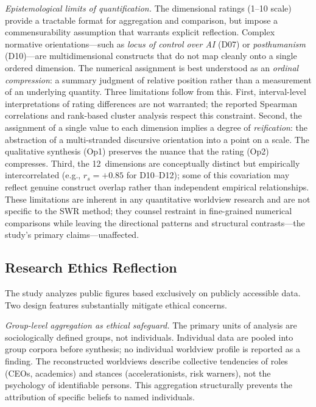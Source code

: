 \documentclass[12pt,a4paper]{article}
\begin{document}
\emph{Epistemological limits of quantification.} The dimensional ratings (1--10 scale) provide a tractable format for aggregation and comparison, but impose a commensurability assumption that warrants explicit reflection. Complex normative orientations---such as \emph{locus of control over AI} (D07) or \emph{posthumanism} (D10)---are multidimensional constructs that do not map cleanly onto a single ordered dimension. The numerical assignment is best understood as an \emph{ordinal compression}: a summary judgment of relative position rather than a measurement of an underlying quantity. Three limitations follow from this. First, interval-level interpretations of rating differences are not warranted; the reported Spearman correlations and rank-based cluster analysis respect this constraint. Second, the assignment of a single value to each dimension implies a degree of \emph{reification}: the abstraction of a multi-stranded discursive orientation into a point on a scale. The qualitative synthesis (Op1) preserves the nuance that the rating (Op2) compresses. Third, the 12~dimensions are conceptually distinct but empirically intercorrelated (e.g., $r_s = +0.85$ for D10--D12); some of this covariation may reflect genuine construct overlap rather than independent empirical relationships. These limitations are inherent in any quantitative worldview research and are not specific to the SWR method; they counsel restraint in fine-grained numerical comparisons while leaving the directional patterns and structural contrasts---the study's primary claims---unaffected.

\subsection{Research Ethics Reflection}

The study analyzes public figures based exclusively on publicly accessible data. Two design features substantially mitigate ethical concerns.

\emph{Group-level aggregation as ethical safeguard.} The primary units of analysis are sociologically defined groups, not individuals. Individual data are pooled into group corpora before synthesis; no individual worldview profile is reported as a finding. The reconstructed worldviews describe collective tendencies of roles (CEOs, academics) and stances (accelerationists, risk warners), not the psychology of identifiable persons. This aggregation structurally prevents the attribution of specific beliefs to named individuals.
\end{document}
